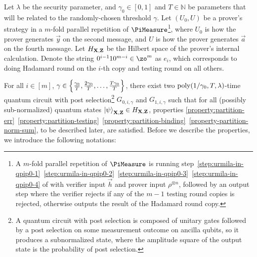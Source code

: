 \begin{lemma}\label{lem:partition2}
	Let $\lambda$ be the security parameter, and $\gamma_0 \in[0,1]$ and $T\in \mathbb{N}$ be parameters that will be related to the randomly-chosen threshold $\gamma$.
	Let $(U_0,U)$ be a prover's strategy in a $m$-fold parallel repetition of $\PiMeasure$\footnote{A $m$-fold parallel repetition of $\PiMeasure$ is running step~\ref{step:urmila-in-qpip0-1}~\ref{step:urmila-in-qpip0-2}~\ref{step:urmila-in-qpip0-3}~\ref{step:urmila-in-qpip0-4} of  with verifier input $\vec{h}$ and prover input $\rho^{\otimes n}$, followed by an output step where the verifier rejects if any of the $m-1$ testing round copies is rejected, otherwise outputs the result of the Hadamard round copy.}, where $U_0$ is how the prover generates $\vec{y}$ on the second message, and $U$ is how the prover generates $\vec{a}$ on the fourth message. Let $H_{\mathbf{X},\mathbf{Z}}$ be the Hilbert space of the prover's internal calculation.
	Denote the string $0^{i-1}10^{m-i} \in \zo^m $ as $e_i$, which corresponds to doing Hadamard round on the $i$-th copy and testing round on all others.

	For all $i\in[m]$, $\gamma \in \left\{\frac{\gamma_0}{T},\frac{2\gamma_0}{T},\dots,\frac{T\gamma_0}{T}\right\}$, there exist two $\operatorname*{\operatorname{poly}}(1/\gamma_0,T,\lambda)$-time quantum circuit with post selection\footnote{A quantum circuit with post selection is composed of unitary gates followed by a post selection on some measurement outcome on ancilla qubits, so it produces a subnormalized state, where the amplitude square of the output state is the probability of post selection.} $G_{0,i,\gamma}$ and $G_{1,i,\gamma}$ such that for all (possibly sub-normalized)  quantum states $\ket{\psi}_{\mathbf{X},\mathbf{Z}}\in  H_{\mathbf{X},\mathbf{Z}}$,  properties \ref{property:partition-err}~\ref{property:partition-testing}~\ref{property:partition-binding}~\ref{property-partition-norm-sum}, to be described later, are satisfied. Before we describe the properties, we introduce the following notations:  


\end{lemma}
